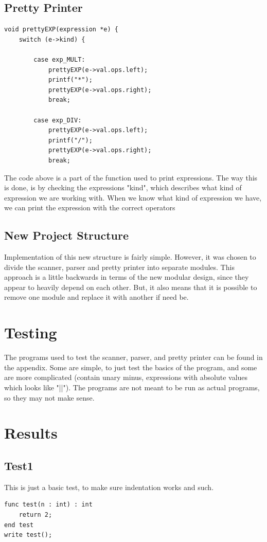 \documentclass[a4paper,10pt,titlepage]{report}
\begin{document}
\subsection{Pretty Printer}
\begin{lstlisting}
void prettyEXP(expression *e) {
    switch (e->kind) {

        case exp_MULT:
            prettyEXP(e->val.ops.left);
            printf("*");
            prettyEXP(e->val.ops.right);
            break;

        case exp_DIV:
            prettyEXP(e->val.ops.left);
            printf("/");
            prettyEXP(e->val.ops.right);
            break;
\end{lstlisting}
The code above is a part of the function used to print expressions. The way this is done, is by checking the expressions "kind", which describes what kind of expression we are working with. When we know what kind of expression we have, we can print the expression with the correct operators

\subsection{New Project Structure}
Implementation of this new structure is fairly simple. However, it was chosen to divide the scanner, parser and pretty printer into separate modules. This approach is a little backwards in terms of the new modular design, since they appear to heavily depend on each other. But, it also means that it is possible to remove one module and replace it with another if need be.

\section{Testing}
The programs used to test the scanner, parser, and pretty printer can be found in the appendix. Some are simple, to just test the basics of the program, and some are more complicated (contain unary minus, expressions with absolute values which looks like "||"). The programs are not meant to be run as actual programs, so they may not make sense.
\section{Results}
\subsection{Test1}
This is just a basic test, to make sure indentation works and such.
\begin{lstlisting}
func test(n : int) : int
    return 2;
end test
write test();
\end{lstlisting}
\end{document}

